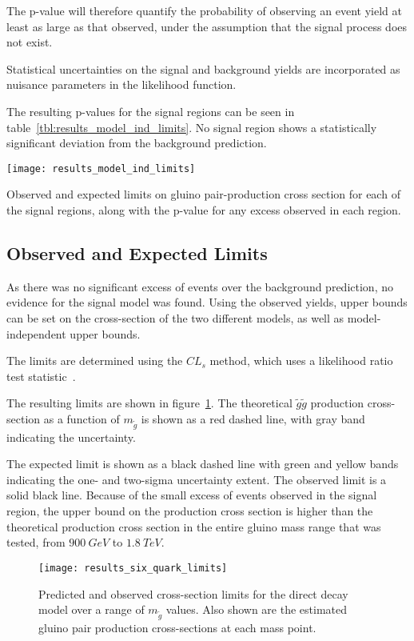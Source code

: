 The p-value will therefore quantify the probability of observing an event yield at least as large as that observed,
under the assumption that the signal process does not exist.

Statistical uncertainties on the signal and background yields are incorporated as nuisance parameters in the likelihood
function.

The resulting p-values for the signal regions can be seen in table~\ref{tbl:results_model_ind_limits}.
No signal region shows a statistically significant deviation from the background prediction.

\begin{table}[!ht]
    \centering
    \texttt{[image: results\_model\_ind\_limits]}
    \caption{Observed and expected limits on gluino pair-production cross section for each of the signal regions,
    along with the p-value for any excess observed in each region.}
\label{tbl:results_model_ind_limits}
\end{table}

\subsection{Observed and Expected Limits}\label{subsec:results_limits}

As there was no significant excess of events over the background prediction, no evidence for the signal model was found.
Using the observed yields, upper bounds can be set on the cross-section of the two different
models, as well as model-independent upper bounds.

The limits are determined using the $CL_s$ method, which uses a likelihood ratio test statistic~\cite{results-stats-cls}.

The resulting limits are shown in figure~\ref{fig:results_six_quark_limits}.
The theoretical $\tilde{g}\tilde{g}$ production cross-section as a function of $m_{\tilde{g}}$ is shown as a red dashed
line, with gray band indicating the uncertainty.

The expected limit is shown as a black dashed line with green and yellow bands indicating the one- and two-sigma uncertainty extent.
The observed limit is a solid black line.
Because of the small excess of events observed in the signal region, the upper bound on the production cross section
is higher than the theoretical production cross section in the entire gluino mass range that was tested,
from $900~GeV$ to $1.8~TeV$.

\begin{figure}[!ht]
    \centering
    \texttt{[image: results\_six\_quark\_limits]}
    \caption{Predicted and observed cross-section limits for the direct decay model over a range of $m_{\tilde{g}}$
    values.
    Also shown are the estimated gluino pair production cross-sections at each mass point.}
\label{fig:results_six_quark_limits}
\end{figure}

